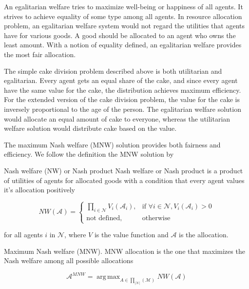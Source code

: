 An egalitarian welfare tries to maximize well-being or happiness of all agents. It strives to achieve equality of some type among all agents. In resource allocation problem, an egalitarian welfare system would not regard the utilities that agents have for various goods. A good should be allocated to an agent who owns the least amount. With a notion of equality defined, an egalitarian welfare provides the most fair allocation.

The simple cake division problem described above is both utilitarian and egalitarian. Every agent gets an equal share of the cake, and since every agent have the same value for the cake, the distribution achieves maximum efficiency. For the extended version of the cake division problem, the value for the cake is inversely proportional to the age of the person. The egalitarian welfare solution would allocate an equal amount of cake to everyone, whereas the utilitarian welfare solution would distribute cake based on the value.

The maximum Nash welfare (MNW) solution provides both fairness and efficiency. We follow the definition the MNW solution by \citet{caragiannis2016unreasonable}

\begin{definition}{Nash welfare (NW) or Nash product} \label{def_nw}
Nash welfare or Nash product is a product of utilities of agents for allocated goods with a condition that every agent values it's allocation positively

\begin{equation}
    NW(\mathcal{A}) = 
    \begin{cases}
    \prod_{i \in \mathcal{N}} V_i(\mathcal{A}_i), & \text{if } \forall i \in \mathcal{N}, V_i(\mathcal{A}_i) > 0 \\
    \text{not defined}, & \text{otherwise}
    \end{cases}
\end{equation}

for all agents $i$ in $\mathcal{N}$, where $V$ is the value function and $\mathcal{A}$ is the allocation.
\end{definition}

\begin{definition}{Maximum Nash welfare (MNW).} \label{def_mnw}
MNW allocation is the one that maximizes the Nash welfare among all possible allocations

$$
    \mathcal{A}^{MNW} = \operatorname{arg\,max}_{A \in \prod_{|\mathcal{N}|}(\mathcal{M})} NW(\mathcal{A})
$$
\end{definition}


